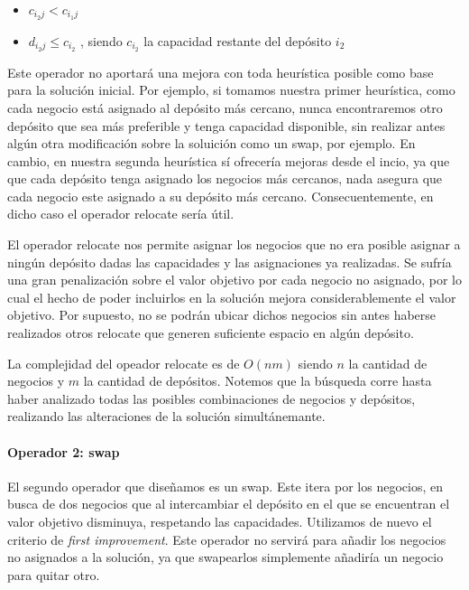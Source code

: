 \documentclass[
]{article}
\begin{document}
\begin{itemize}
\item
  \(c_{i_2j} < c_{i_1j}\)
\item
  \(d_{i_2j} \leq c_{i_2}\) , siendo \(c_{i_2}\) la capacidad restante
  del depósito \(i_2\)
\end{itemize}

Este operador no aportará una mejora con toda heurística posible como
base para la solución inicial. Por ejemplo, si tomamos nuestra primer
heurística, como cada negocio está asignado al depósito más cercano,
nunca encontraremos otro depósito que sea más preferible y tenga
capacidad disponible, sin realizar antes algún otra modificación sobre
la soluición como un swap, por ejemplo. En cambio, en nuestra segunda
heurística sí ofrecería mejoras desde el incio, ya que que cada depósito
tenga asignado los negocios más cercanos, nada asegura que cada negocio
este asignado a su depósito más cercano. Consecuentemente, en dicho caso
el operador relocate sería útil.

El operador relocate nos permite asignar los negocios que no era posible
asignar a ningún depósito dadas las capacidades y las asignaciones ya
realizadas. Se sufría una gran penalización sobre el valor objetivo por
cada negocio no asignado, por lo cual el hecho de poder incluirlos en la
solución mejora considerablemente el valor objetivo. Por supuesto, no se
podrán ubicar dichos negocios sin antes haberse realizados otros
relocate que generen suficiente espacio en algún depósito.

La complejidad del opeador relocate es de \(O(nm)\) siendo \(n\) la
cantidad de negocios y \(m\) la cantidad de depósitos. Notemos que la
búsqueda corre hasta haber analizado todas las posibles combinaciones de
negocios y depósitos, realizando las alteraciones de la solución
simultánemante.

\hypertarget{operador-2-swap}{%
\paragraph{Operador 2: swap}\label{operador-2-swap}}

El segundo operador que diseñamos es un swap. Este itera por los
negocios, en busca de dos negocios que al intercambiar el depósito en el
que se encuentran el valor objetivo disminuya, respetando las
capacidades. Utilizamos de nuevo el criterio de \emph{first
improvement}. Este operador no servirá para añadir los negocios no
asignados a la solución, ya que swapearlos simplemente añadiría un
negocio para quitar otro.
\end{document}
